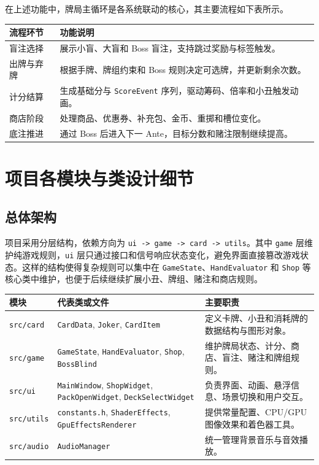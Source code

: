 \documentclass[UTF8,11pt,a4paper]{ctexart}
\newcommand{\code}[1]{\texttt{\small #1}}
\begin{document}
在上述功能中，牌局主循环是各系统联动的核心，其主要流程如下表所示。

\begin{center}
\small
\begin{tabularx}{\textwidth}{L{3.0cm}Y}
\toprule
{}
流程环节 & 功能说明 \\
\midrule
盲注选择 & 展示小盲、大盲和 Boss 盲注，支持跳过奖励与标签触发。 \\
出牌与弃牌 & 根据手牌、牌组约束和 Boss 规则决定可选牌，并更新剩余次数。 \\
计分结算 & 生成基础分与 \code{ScoreEvent} 序列，驱动筹码、倍率和小丑触发动画。 \\
商店阶段 & 处理商品、优惠券、补充包、金币、重掷和槽位变化。 \\
底注推进 & 通过 Boss 后进入下一 Ante，目标分数和赌注限制继续提高。 \\
\bottomrule
\end{tabularx}
\end{center}

\section{项目各模块与类设计细节}

\subsection{总体架构}

项目采用分层结构，依赖方向为 \code{ui -> game -> card -> utils}。其中 \code{game} 层维护纯游戏规则，\code{ui} 层只通过接口和信号响应状态变化，避免界面直接篡改游戏状态。这样的结构使得复杂规则可以集中在 \code{GameState}、\code{HandEvaluator} 和 \code{Shop} 等核心类中维护，也便于后续继续扩展小丑、牌组、赌注和商店规则。

\begin{center}
\small
\begin{tabularx}{\textwidth}{L{2.5cm}L{4.1cm}Y}
\toprule
{}
模块 & 代表类或文件 & 主要职责 \\
\midrule
\code{src/card} & \code{CardData}, \code{Joker}, \code{CardItem} & 定义卡牌、小丑和消耗牌的数据结构与图形对象。 \\
\code{src/game} & \code{GameState}, \code{HandEvaluator}, \code{Shop}, \code{BossBlind} & 维护牌局状态、计分、商店、盲注、赌注和牌组规则。 \\
\code{src/ui} & \code{MainWindow}, \code{ShopWidget}, \code{PackOpenWidget}, \code{DeckSelectWidget} & 负责界面、动画、悬浮信息、场景切换和用户交互。 \\
\code{src/utils} & \code{constants.h}, \code{ShaderEffects}, \code{GpuEffectsRenderer} & 提供常量配置、CPU/GPU 图像效果和着色器工具。 \\
\code{src/audio} & \code{AudioManager} & 统一管理背景音乐与音效播放。 \\
\bottomrule
\end{tabularx}
\end{center}
\end{document}
